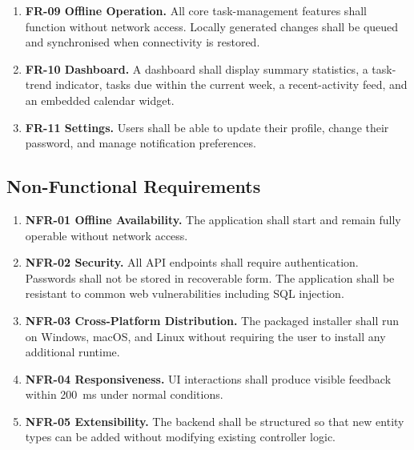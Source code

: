 \begin{enumerate}
    \item \textbf{FR-09 Offline Operation.}
          All core task-management features shall function without network access.
          Locally generated changes shall be queued and synchronised when connectivity
          is restored.

    \item \textbf{FR-10 Dashboard.}
          A dashboard shall display summary statistics, a task-trend indicator, tasks
          due within the current week, a recent-activity feed, and an embedded calendar
          widget.

    \item \textbf{FR-11 Settings.}
          Users shall be able to update their profile, change their password, and manage
          notification preferences.
\end{enumerate}

\subsection*{Non-Functional Requirements}

\begin{enumerate}
    \item \textbf{NFR-01 Offline Availability.}
          The application shall start and remain fully operable without network access.

    \item \textbf{NFR-02 Security.}
          All API endpoints shall require authentication. Passwords shall not be stored
          in recoverable form. The application shall be resistant to common web
          vulnerabilities including SQL injection.

    \item \textbf{NFR-03 Cross-Platform Distribution.}
          The packaged installer shall run on Windows, macOS, and Linux without
          requiring the user to install any additional runtime.

    \item \textbf{NFR-04 Responsiveness.}
          UI interactions shall produce visible feedback within 200~ms under normal
          conditions.

    \item \textbf{NFR-05 Extensibility.}
          The backend shall be structured so that new entity types can be added without
          modifying existing controller logic.
\end{enumerate}

